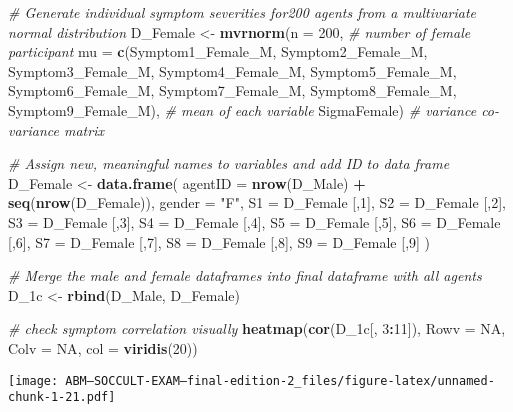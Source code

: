 \documentclass[]{article}
\newenvironment{Shaded}{\begin{snugshade}}{\end{snugshade}}
\newcommand{\KeywordTok}[1]{\textcolor[rgb]{0.13,0.29,0.53}{\textbf{#1}}}
\newcommand{\DataTypeTok}[1]{\textcolor[rgb]{0.13,0.29,0.53}{#1}}
\newcommand{\DecValTok}[1]{\textcolor[rgb]{0.00,0.00,0.81}{#1}}
\newcommand{\StringTok}[1]{\textcolor[rgb]{0.31,0.60,0.02}{#1}}
\newcommand{\CommentTok}[1]{\textcolor[rgb]{0.56,0.35,0.01}{\textit{#1}}}
\newcommand{\OtherTok}[1]{\textcolor[rgb]{0.56,0.35,0.01}{#1}}
\newcommand{\OperatorTok}[1]{\textcolor[rgb]{0.81,0.36,0.00}{\textbf{#1}}}
\newcommand{\NormalTok}[1]{#1}
\begin{document}
\begin{Shaded}
\begin{Highlighting}[]
\CommentTok{# Generate individual symptom severities for200 agents from a multivariate normal distribution}
\NormalTok{D_Female <-}\StringTok{ }\KeywordTok{mvrnorm}\NormalTok{(}\DataTypeTok{n =} \DecValTok{200}\NormalTok{, }\CommentTok{# number of female participant}
                    \DataTypeTok{mu =} \KeywordTok{c}\NormalTok{(Symptom1_Female_M, Symptom2_Female_M, Symptom3_Female_M, Symptom4_Female_M, Symptom5_Female_M, Symptom6_Female_M, Symptom7_Female_M, Symptom8_Female_M, Symptom9_Female_M), }\CommentTok{# mean of each variable}
\NormalTok{                    SigmaFemale) }\CommentTok{# variance co-variance matrix}

\CommentTok{# Assign new, meaningful names to variables and add ID to data frame}
\NormalTok{D_Female <-}\StringTok{ }\KeywordTok{data.frame}\NormalTok{(}
  \DataTypeTok{agentID =} \KeywordTok{nrow}\NormalTok{(D_Male) }\OperatorTok{+}\StringTok{ }\KeywordTok{seq}\NormalTok{(}\KeywordTok{nrow}\NormalTok{(D_Female)),}
  \DataTypeTok{gender =} \StringTok{"F"}\NormalTok{,}
  \DataTypeTok{S1 =}\NormalTok{ D_Female [,}\DecValTok{1}\NormalTok{],}
  \DataTypeTok{S2 =}\NormalTok{  D_Female [,}\DecValTok{2}\NormalTok{],}
  \DataTypeTok{S3 =}\NormalTok{  D_Female [,}\DecValTok{3}\NormalTok{],}
  \DataTypeTok{S4 =}\NormalTok{ D_Female [,}\DecValTok{4}\NormalTok{],}
  \DataTypeTok{S5 =}\NormalTok{ D_Female [,}\DecValTok{5}\NormalTok{],}
  \DataTypeTok{S6 =}\NormalTok{  D_Female [,}\DecValTok{6}\NormalTok{],}
  \DataTypeTok{S7 =}\NormalTok{  D_Female [,}\DecValTok{7}\NormalTok{],}
  \DataTypeTok{S8 =}\NormalTok{ D_Female [,}\DecValTok{8}\NormalTok{],}
  \DataTypeTok{S9 =}\NormalTok{ D_Female [,}\DecValTok{9}\NormalTok{]}
\NormalTok{)}

\CommentTok{# Merge the male and female dataframes into final dataframe with all agents}
\NormalTok{D_1c <-}\StringTok{ }\KeywordTok{rbind}\NormalTok{(D_Male, D_Female)}

\CommentTok{# check symptom correlation visually}
\KeywordTok{heatmap}\NormalTok{(}\KeywordTok{cor}\NormalTok{(D_1c[, }\DecValTok{3}\OperatorTok{:}\DecValTok{11}\NormalTok{]), }\DataTypeTok{Rowv =} \OtherTok{NA}\NormalTok{, }\DataTypeTok{Colv =} \OtherTok{NA}\NormalTok{, }\DataTypeTok{col =} \KeywordTok{viridis}\NormalTok{(}\DecValTok{20}\NormalTok{))}
\end{Highlighting}
\end{Shaded}

\texttt{[image: ABM---SOCCULT-EXAM---final-edition-2\_files/figure-latex/unnamed-chunk-1-21.pdf]}
\end{document}
